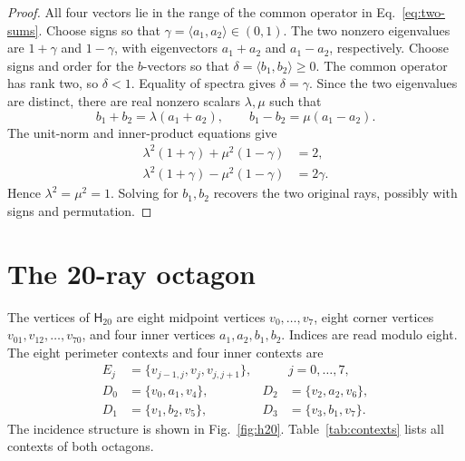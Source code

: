 \documentclass[12pt,a4paper]{article}
\theoremstyle{definition}
\theoremstyle{remark}
\newcommand{\Htwenty}{\mathsf H_{20}}
\begin{document}
\begin{proof}
All four vectors lie in the range of the common operator in
Eq.~\eqref{eq:two-sums}.  Choose signs so that
$\gamma=\langle a_1,a_2\rangle\in(0,1)$.  The two nonzero eigenvalues
are $1+\gamma$ and $1-\gamma$, with eigenvectors $a_1+a_2$ and
$a_1-a_2$, respectively.  Choose signs and order for the $b$-vectors so
that $\delta=\langle b_1,b_2\rangle\ge0$.  The common operator has rank two,
so $\delta<1$.  Equality of spectra gives
$\delta=\gamma$.  Since the two eigenvalues are distinct, there are real
nonzero scalars $\lambda,\mu$ such that
\[
 b_1+b_2=\lambda(a_1+a_2),\qquad
 b_1-b_2=\mu(a_1-a_2).
\]
The unit-norm and inner-product equations give
\begin{align*}
 \lambda^2(1+\gamma)+\mu^2(1-\gamma)&=2,\\
 \lambda^2(1+\gamma)-\mu^2(1-\gamma)&=2\gamma.
\end{align*}
Hence $\lambda^2=\mu^2=1$.  Solving for $b_1,b_2$ recovers the two
original rays, possibly with signs and permutation.
\end{proof}

\section{The 20-ray octagon}
\label{sec:h20}

The vertices of $\Htwenty$ are eight midpoint vertices
$v_0,\ldots,v_7$, eight corner vertices
$v_{01},v_{12},\ldots,v_{70}$, and four inner vertices
$a_1,a_2,b_1,b_2$.  Indices are read modulo eight.  The eight perimeter
contexts and four inner contexts are
\begin{align}
 E_j&=\{v_{j-1,j},v_j,v_{j,j+1}\}, &&j=0,\ldots,7,
 \label{eq:perimeter-contexts}\\
 D_0&=\{v_0,a_1,v_4\},&D_2&=\{v_2,a_2,v_6\},\nonumber\\
 D_1&=\{v_1,b_2,v_5\},&D_3&=\{v_3,b_1,v_7\}.
 \label{eq:inner-contexts}
\end{align}
The incidence structure is shown in Fig.~\ref{fig:h20}.
Table~\ref{tab:contexts} lists all contexts of both octagons.
\end{document}
